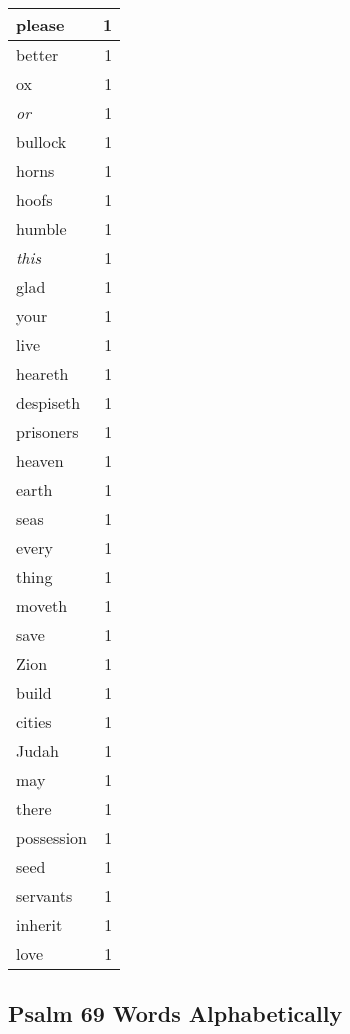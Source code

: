 \begin{center}
\begin{longtable}{l|r}
please & 1\\ \hline 
better & 1\\ \hline 
ox & 1\\ \hline 
\emph{or} & 1\\ \hline 
bullock & 1\\ \hline 
horns & 1\\ \hline 
hoofs & 1\\ \hline 
humble & 1\\ \hline 
\emph{this} & 1\\ \hline 
glad & 1\\ \hline 
your & 1\\ \hline 
live & 1\\ \hline 
heareth & 1\\ \hline 
despiseth & 1\\ \hline 
prisoners & 1\\ \hline 
heaven & 1\\ \hline 
earth & 1\\ \hline 
seas & 1\\ \hline 
every & 1\\ \hline 
thing & 1\\ \hline 
moveth & 1\\ \hline 
save & 1\\ \hline 
Zion & 1\\ \hline 
build & 1\\ \hline 
cities & 1\\ \hline 
Judah & 1\\ \hline 
may & 1\\ \hline 
there & 1\\ \hline 
possession & 1\\ \hline 
seed & 1\\ \hline 
servants & 1\\ \hline 
inherit & 1\\ \hline 
love & 1\\ \hline 
\end{longtable}
\end{center}





\subsection{Psalm 69 Words Alphabetically}


\normalsize
 
